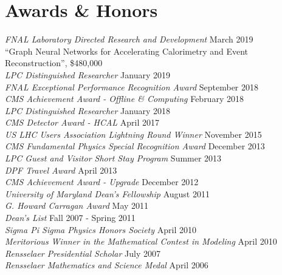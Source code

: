 \section{Awards \& Honors}
{\sl FNAL Laboratory Directed Research and Development} \hfill March 2019\\
``Graph Neural Networks for Accelerating Calorimetry and Event Reconstruction'', \$480,000\\
{\sl LPC Distinguished Researcher} \hfill January 2019\\
{\sl FNAL Exceptional Performance Recognition Award} \hfill September 2018\\
{\sl CMS Achievement Award - Offline \& Computing} \hfill February 2018\\
{\sl LPC Distinguished Researcher} \hfill January 2018\\
{\sl CMS Detector Award - HCAL } \hfill April 2017\\
\ifdefined\longflag
{\sl US LHC Users Association Lightning Round Winner} \hfill November 2015\\
\fi
{\sl CMS Fundamental Physics Special Recognition Award} \hfill December 2013\\
\ifdefined\longestflag
{\sl LPC Guest and Visitor Short Stay Program} \hfill Summer 2013\\
{\sl DPF Travel Award} \hfill April 2013\\
\fi
{\sl CMS Achievement Award - Upgrade} \hfill December 2012\\
\ifdefined\longerflag
{\sl University of Maryland Dean's Fellowship} \hfill August 2011\\
\fi
{\sl G. Howard Carragan Award} \hfill May 2011%
\ifdefined\longflag
\\
\ifdefined\longerflag
{\sl Dean's List} \hfill Fall 2007 - Spring 2011\\
\fi
{\sl Sigma Pi Sigma Physics Honors Society} \hfill April 2010\\
{\sl Meritorious Winner in the Mathematical Contest in Modeling} \hfill April 2010\\
{\sl Rensselaer Presidential Scholar} \hfill July 2007\\
{\sl Rensselaer Mathematics and Science Medal} \hfill April 2006%
\fi